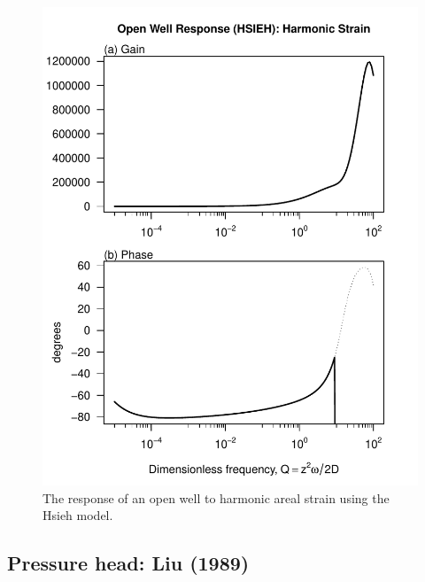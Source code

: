 \documentclass[10pt]{article}\usepackage[]{graphicx}\usepackage[]{color}
\makeatletter
\def\maxwidth{ %
  \ifdim\Gin@nat@width>\linewidth
    \linewidth
  \else
    \Gin@nat@width
  \fi
}
\newenvironment{knitrout}{}{} %
\makeatother
\begin{document}
\begin{figure}[htb!]
\begin{center}
\begin{knitrout}
\color{fgcolor}
\includegraphics[width=\maxwidth]{figure/HSIEHRESPFIG} 

\end{knitrout}

\caption{The response of an open well to harmonic areal strain using
the Hsieh model. 
}
\label{fig:owrsp-hsi}
\end{center}
\end{figure}

\subsection{Pressure head: Liu (1989)}
\citet{liu1989}
\end{document}
